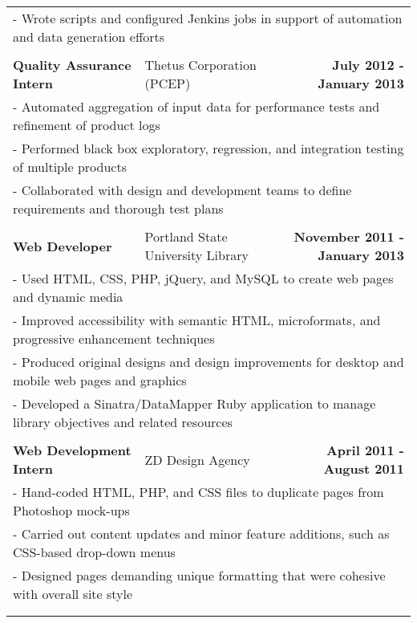\documentclass[letterpaper]{article}
\begin{document}
\begin{center}
\begin{tabular}{p{}p{}r}
			\\
				\multicolumn{3}{p{\textwidth}}{\quad\quad - Wrote scripts and configured Jenkins jobs in support of automation and data generation efforts} 
			\\
			\\
				\textbf{Quality Assurance Intern}					&
				Thetus Corporation (PCEP)							&
				\textbf{July 2012 - January 2013}
			\\
				\multicolumn{3}{p{\textwidth}}{\quad\quad - Automated aggregation of input data for performance tests and refinement of product logs}
			\\
				\multicolumn{3}{p{\textwidth}}{\quad\quad - Performed black box exploratory, regression, and integration testing of multiple products} 
			\\
				\multicolumn{3}{p{\textwidth}}{\quad\quad - Collaborated with design and development teams to define requirements and thorough test plans}
			\\
			\\
				\textbf{Web Developer}						&
				Portland State University Library					&
				\textbf{November 2011 - January 2013}
			\\
				\multicolumn{3}{p{\textwidth}}{\quad\quad - Used HTML, CSS, PHP, jQuery, and MySQL to create web pages and dynamic media} 
			\\
				\multicolumn{3}{p{\textwidth}}{\quad\quad - Improved accessibility with semantic HTML, microformats, and progressive enhancement techniques} 
			\\
				\multicolumn{3}{p{\textwidth}}{\quad\quad - Produced original designs and design improvements for desktop and mobile web pages and graphics} 
			\\
				\multicolumn{3}{p{\textwidth}}{\quad\quad - Developed a Sinatra/DataMapper Ruby application to manage library objectives and related resources} 
			\\
			\\
				\textbf{Web Development Intern}						&
				ZD Design Agency									&
				\textbf{April 2011 - August 2011}
			\\
				\multicolumn{3}{p{\textwidth}}{\quad\quad - Hand-coded HTML, PHP, and CSS files to duplicate pages from Photoshop mock-ups} 
			\\
				\multicolumn{3}{p{\textwidth}}{\quad\quad - Carried out content updates and minor feature additions, such as CSS-based drop-down menus} 
			\\
				\multicolumn{3}{p{\textwidth}}{\quad\quad - Designed pages demanding unique formatting that were cohesive with overall site style} 
			\\
			\\
			\\
		\end{tabular}


\end{center}
\end{document}
